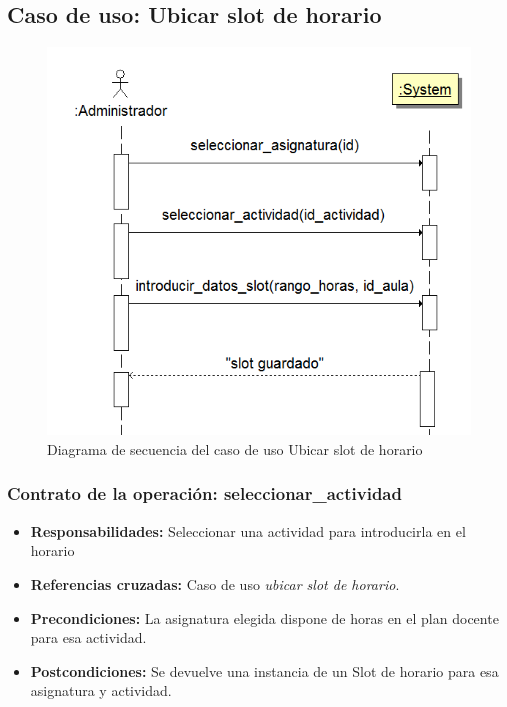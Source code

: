 \documentclass{book}
\begin{document}
\subsection{Caso de uso: Ubicar slot de horario}
\begin{figure}[H] 
  \label{comportamiento-ubicar-slot} 
	\begin{center}
    \includegraphics[scale=0.5]{./secuencia-ubicar-slot.png}
  \end{center}
\caption{Diagrama de secuencia del caso de uso Ubicar slot de horario}
\end{figure}

\subsubsection{Contrato de la operación: seleccionar\_actividad}
\begin{itemize}
\item {\bf Responsabilidades:} Seleccionar una actividad para introducirla en el horario
\item {\bf Referencias cruzadas:} Caso de uso {\em ubicar slot de horario}.
\item {\bf Precondiciones:} La asignatura elegida dispone de horas en el plan docente para esa actividad.
\item {\bf Postcondiciones:} Se devuelve una instancia de un Slot de horario para esa asignatura y actividad.
\end{itemize}
\end{document}
